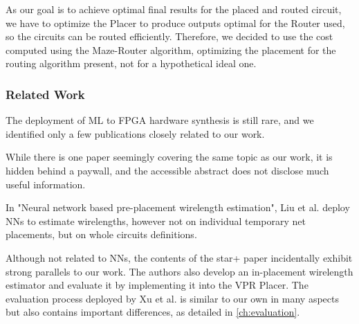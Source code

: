 As our goal is to achieve optimal final results for the placed and routed circuit, we have to optimize the Placer to produce outputs optimal for the Router used, so the circuits can be routed efficiently. Therefore, we decided to use the cost computed using the Maze-Router algorithm, optimizing the placement for the routing algorithm present, not for a hypothetical ideal one.

\subsubsection{Related Work}

The deployment of \gls{ML} to \gls{FPGA} hardware synthesis is still rare\cite{routability-estimator}, and we identified only a few publications closely related to our work. 

While there is one paper seemingly covering the same topic as our work, it is hidden behind a paywall, and the accessible abstract does not disclose much useful information.\cite{doi:10.1142/S0218213098000202}

In "Neural network based pre-placement wirelength estimation"\cite{pre-placement-estimation}, Liu et al. deploy \glspl{NN} to estimate wirelengths, however not on individual temporary net placements, but on whole circuits definitions.

Although not related to \glspl{NN}, the contents of the star+ paper incidentally exhibit strong parallels to our work. The authors also develop an in-placement wirelength estimator and evaluate it by implementing it into the \gls{VPR} Placer. The evaluation process deployed by Xu et al. is similar to our own in many aspects but also contains important differences, as detailed in \ref{ch:evaluation}.
